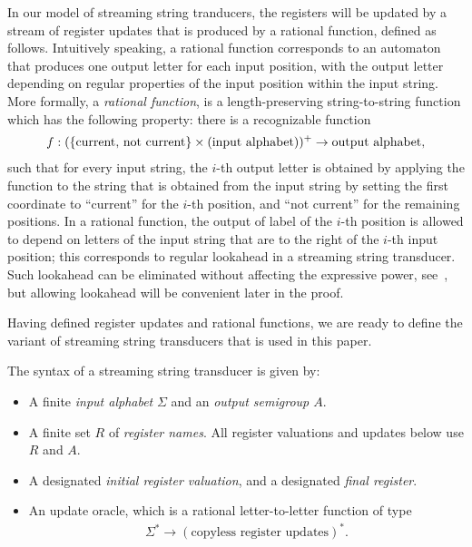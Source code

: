 In our model of streaming string tranducers, the registers will be updated by a stream of register updates that is produced by a {rational function}, defined as follows.  Intuitively speaking, a rational function corresponds to an automaton that produces one output letter for each input position, with the output letter depending on regular properties of the input position within the input string. More formally, a \emph{rational function}, is a length-preserving string-to-string function which has the following property: there is a recognizable function 
\begin{align*}
 f : (\{\text{current, not current}\} \times \text{(input alphabet)})^+ \to \text{output alphabet},
\end{align*}
such that for every input string, the  $i$-th output letter is obtained by applying the function
to the string that is obtained from the input string by setting the first coordinate to ``current'' for the $i$-th position, and ``not current'' for the remaining positions. In a rational function, the output of label of the $i$-th position is allowed to depend on letters of the input string that are to the right of the $i$-th input position; this corresponds to regular lookahead in a streaming string transducer. Such lookahead can be eliminated without affecting the expressive power, see~\cite[Section 12.3]{bojanczyk_automata_2018}, but allowing lookahead will be convenient later in the proof.

Having defined register updates and rational functions, we are ready to define the variant of streaming string transducers that is used in this paper.



\begin{definition}\label{def:usual-sst}
    The syntax of a streaming string transducer is given by:
\begin{itemize}
    \item A finite \emph{input alphabet} $\Sigma$ and an \emph{output semigroup $A$}.
    \item A finite set $R$ of \emph{register names}. All register valuations and updates below use $R$ and $A$.
    \item A designated \emph{initial register valuation}, and a designated \emph{final register}.
    \item An update oracle, which is a rational letter-to-letter function of type 
    \begin{align*}
    \Sigma^* \to (\text{copyless register updates})^*.
    \end{align*}
\end{itemize}
\end{definition}

